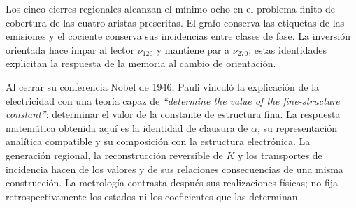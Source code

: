 Los cinco cierres regionales alcanzan el mínimo ocho en el problema
finito de cobertura de las cuatro aristas prescritas. El grafo conserva
las etiquetas de las emisiones y el cociente conserva sus incidencias
entre clases de fase. La inversión orientada hace impar al lector
\(\nu_{120}\) y mantiene par a \(\nu_{270}\); estas identidades
explicitan la respuesta de la memoria al cambio de orientación.
\par %




Al cerrar su conferencia Nobel de 1946, Pauli vinculó la explicación de la electricidad con una teoría capaz de \emph{“determine the value of the fine-structure constant”}\cite{pauli1946}: determinar el valor de la constante de estructura fina. La respuesta matemática obtenida aquí es la identidad de clausura de \(\alpha\), su representación analítica compatible y su composición con la estructura electrónica. La generación regional, la reconstrucción reversible de \(K\) y los transportes de incidencia hacen de los valores y de sus relaciones consecuencias de una misma construcción. La metrología contrasta después sus realizaciones físicas; no fija retrospectivamente los estados ni los coeficientes que las determinan.



\par\endgroup
